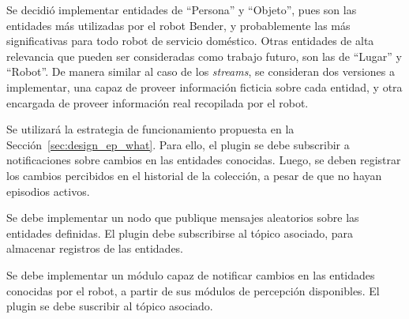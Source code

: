 Se decidió implementar entidades de ``Persona'' y ``Objeto'', pues son las entidades más utilizadas por el robot Bender, y probablemente las más significativas para todo robot de servicio doméstico. Otras entidades de alta relevancia que pueden ser consideradas como trabajo futuro, son las de ``Lugar'' y ``Robot''. De manera similar al caso de los \textit{streams}, se consideran dos versiones a implementar, una capaz de proveer información ficticia sobre cada entidad, y otra encargada de proveer información real recopilada por el robot.

Se utilizará la estrategia de funcionamiento propuesta en la Sección~\ref{sec:design_ep_what}. Para ello, el plugin se debe subscribir a notificaciones sobre cambios en las entidades conocidas. Luego, se deben registrar los cambios percibidos en el historial de la colección, a pesar de que no hayan episodios activos.

Se debe implementar un nodo que publique mensajes aleatorios sobre las entidades definidas. El plugin debe subscribirse al tópico asociado, para almacenar registros de las entidades.

Se debe implementar un módulo capaz de notificar cambios en las entidades conocidas por el robot, a partir de sus módulos de percepción disponibles. El plugin se debe suscribir al tópico asociado.


